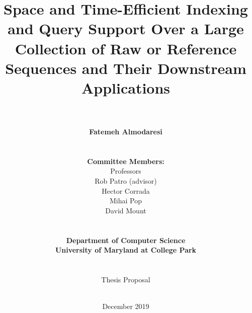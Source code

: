 \documentclass[12pt, letterpaper, twoside]{report}
\title{Space and Time-Efficient Indexing and Query Support Over a Large Collection of Raw or Reference Sequences and Their Downstream Applications}
\author{\\ \\ \textbf{Fatemeh Almodaresi} \\ \\ \\ \textbf{Committee Members:} \\ Professors \\ Rob Patro (advisor) \\ Hector Corrada \\ Mihai Pop \\ David Mount \\ \\ \\ \textbf{Department of Computer Science} \\ \textbf{University of Maryland at College Park} \\ \\ \\ Thesis Proposal \\ \\ }
\date{ December 2019}
\theoremstyle{definition}
\begin{document}
\begin{titlepage}
\maketitle
\end{titlepage}
 


\newpage

\tableofcontents

\newpage












%
\end{document}

